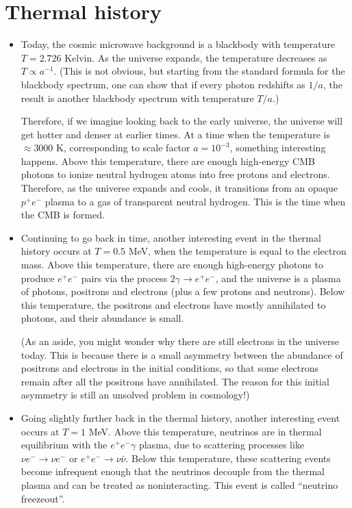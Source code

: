 \documentclass[aps,prd,superscriptaddress,groupedaddress,nofootinbib,nobibnotes]{revtex4}
\begin{document}
\section{Thermal history}

\begin{itemize}

\item
Today, the cosmic microwave background is a blackbody with temperature $T = 2.726$ Kelvin.
As the universe expands, the temperature decreases as $T \propto a^{-1}$.  (This is not obvious,
but starting from the standard formula for the blackbody spectrum, one can show that if every
photon redshifts as $1/a$, the result is another blackbody spectrum with temperature $T/a$.)

Therefore, if we imagine looking back to the early universe, the universe will get hotter and 
denser at earlier times.  At a time when the temperature is $\approx 3000$ K, corresponding to
scale factor $a = 10^{-3}$, something interesting happens.  Above this temperature, there are
enough high-energy CMB photons to ionize neutral hydrogen atoms into free protons and electrons.
Therefore, as the universe expands and cools, it transitions from an opaque $p^+e^-$ plasma to a gas
of transparent neutral hydrogen.  This is the time when the CMB is formed.

\item
Continuing to go back in time, another interesting event in the thermal history occurs at $T = 0.5$ MeV,
when the temperature is equal to the electron mass.  Above this temperature, there are enough high-energy
photons to produce $e^+e^-$ pairs via the process $2\gamma \rightarrow e^+e^-$, and the universe is a
plasma of photons, positrons and electrons (plus a few protons and neutrons).  Below this temperature,
the positrons and electrons have mostly annihilated to photons, and their abundance is small.  

(As an aside, you might wonder why there are still electrons in the universe today.  This is because there is
a small asymmetry between the abundance of positrons and electrons in the initial conditions, so that some electrons
remain after all the positrons have annihilated.  The reason for this initial asymmetry is still an unsolved problem
in cosmology!)

\item
Going slightly further back in the thermal history, another interesting event occurs at $T = 1$ MeV.
Above this temperature, neutrinos are in thermal equilibrium with the $e^+e^-\gamma$ plasma, due to
scattering processes like $\nu e^- \rightarrow \nu e^-$ or $e^+e^- \rightarrow \nu \bar \nu$.
Below this temperature, these scattering events become infrequent enough that the neutrinos decouple
from the thermal plasma and can be treated as noninteracting.  This event is called ``neutrino freezeout''.


\end{itemize}
\end{document}
